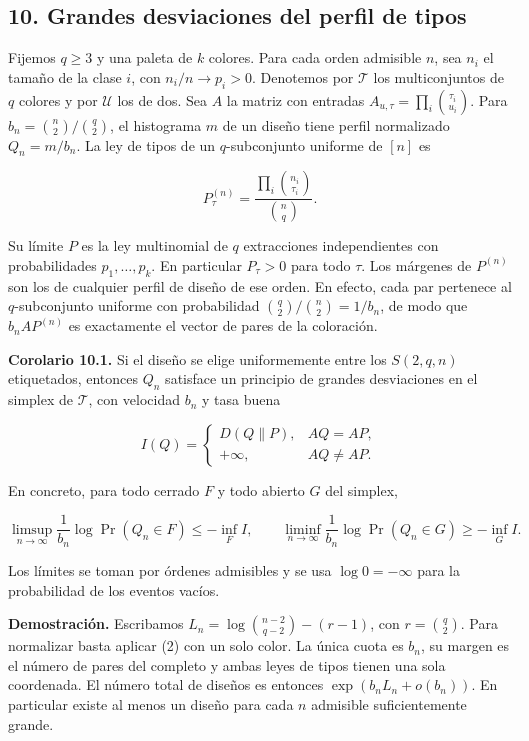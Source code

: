 \documentclass[spanish,11pt,a4paper]{article}
\begin{document}
\subsection{10. Grandes desviaciones del perfil de tipos}\label{grandes-desviaciones-del-perfil-de-tipos}

Fijemos \(q\ge3\) y una paleta de \(k\) colores. Para cada orden admisible \(n\), sea \(n_i\) el tamaño de la clase \(i\), con \(n_i/n\to p_i>0\). Denotemos por \(\mathcal T\) los multiconjuntos de \(q\) colores y por \(\mathcal U\) los de dos. Sea \(A\) la matriz con entradas \(A_{u,\tau}=\prod_i\binom{\tau_i}{u_i}\). Para \(b_n=\binom n2/\binom q2\), el histograma \(m\) de un diseño tiene perfil normalizado \(Q_n=m/b_n\). La ley de tipos de un \(q\)-subconjunto uniforme de \([n]\) es

\[P^{(n)}_\tau=\frac{\prod_i\binom{n_i}{\tau_i}}{\binom n q}.\]

Su límite \(P\) es la ley multinomial de \(q\) extracciones independientes con probabilidades \(p_1,\dots,p_k\). En particular \(P_\tau>0\) para todo \(\tau\). Los márgenes de \(P^{(n)}\) son los de cualquier perfil de diseño de ese orden. En efecto, cada par pertenece al \(q\)-subconjunto uniforme con probabilidad \(\binom q2/\binom n2=1/b_n\), de modo que \(b_n A P^{(n)}\) es exactamente el vector de pares de la coloración.

\textbf{Corolario 10.1.} Si el diseño se elige uniformemente entre los \(S(2,q,n)\) etiquetados, entonces \(Q_n\) satisface un principio de grandes desviaciones en el simplex de \(\mathcal T\), con velocidad \(b_n\) y tasa buena

\[I(Q)=
\begin{cases}
D(Q\|P),&AQ=AP,\\
+\infty,&AQ\ne AP.
\end{cases}
\tag{10.1}\]

En concreto, para todo cerrado \(F\) y todo abierto \(G\) del simplex,

\[\limsup_{n\to\infty}\frac1{b_n}\log\Pr(Q_n\in F)\le-\inf_F I,
\qquad
\liminf_{n\to\infty}\frac1{b_n}\log\Pr(Q_n\in G)\ge-\inf_G I.\]

Los límites se toman por órdenes admisibles y se usa \(\log 0=-\infty\) para la probabilidad de los eventos vacíos.

\textbf{Demostración.} Escribamos \(L_n=\log\binom{n-2}{q-2}-(r-1)\), con \(r=\binom q2\). Para normalizar basta aplicar (2) con un solo color. La única cuota es \(b_n\), su margen es el número de pares del completo y ambas leyes de tipos tienen una sola coordenada. El número total de diseños es entonces \(\exp(b_n L_n+o(b_n))\). En particular existe al menos un diseño para cada \(n\) admisible suficientemente grande.
\end{document}
